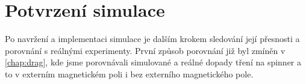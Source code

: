 \chapter{Potvrzení simulace}
\label{chap:sim_confirmation}

Po navržení a implementaci simulace je dalším krokem sledování její přesnosti a porovnání s reálnými experimenty. První způsob porovnání již byl zmíněn v \autoref{chap:drag}, kde jsme porovnávali simulované a reálné dopady tření na spinner a to v externím magnetickém poli i bez externího magnetického pole. 